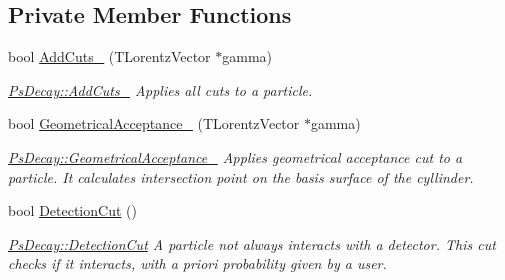 \subsection*{Private Member Functions}
\begin{DoxyCompactItemize}
\item 
bool \hyperlink{classPsDecay_aa0df6edea1fa6961cbf5307a2c975e3b}{Add\+Cuts\+\_\+} (T\+Lorentz\+Vector $\ast$gamma)
\begin{DoxyCompactList}\small\item\em \hyperlink{classPsDecay_aa0df6edea1fa6961cbf5307a2c975e3b}{Ps\+Decay\+::\+Add\+Cuts\+\_\+} Applies all cuts to a particle. \end{DoxyCompactList}\item 
bool \hyperlink{classPsDecay_a183a1874ec37ec1eea0fe82fde501ef0}{Geometrical\+Acceptance\+\_\+} (T\+Lorentz\+Vector $\ast$gamma)
\begin{DoxyCompactList}\small\item\em \hyperlink{classPsDecay_a183a1874ec37ec1eea0fe82fde501ef0}{Ps\+Decay\+::\+Geometrical\+Acceptance\+\_\+} Applies geometrical acceptance cut to a particle. It calculates intersection point on the basis surface of the cyllinder. \end{DoxyCompactList}\item 
bool \hyperlink{classPsDecay_a98329cfeebbca0017123fd7928de1cfe}{Detection\+Cut} ()
\begin{DoxyCompactList}\small\item\em \hyperlink{classPsDecay_a98329cfeebbca0017123fd7928de1cfe}{Ps\+Decay\+::\+Detection\+Cut} A particle not always interacts with a detector. This cut checks if it interacts, with a priori probability given by a user. \end{DoxyCompactList}\end{DoxyCompactItemize}
